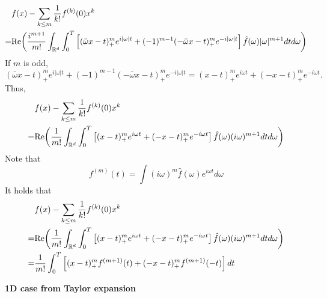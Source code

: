 \begin{equation}
\begin{split}
&f(x) - \sum_{k\le m}{1\over k!}f^{(k)}(0) x^k 
\\ 
=&{\rm Re} \bigg ({i^{m+1}\over m!}\int_{\mathbb{R}^d} \int_{0}^T\left[(\bar \omega  x - t)_+^me^{i|\omega|t}
+(-1)^{m-1}(-\bar \omega x - t)_+^me^{-i|\omega|t} \right]\hat{f}(\omega)|\omega|^{m+1}dt d\omega\bigg ) 
\end{split}
\end{equation}
If $m$ is odd,
$$
(\bar \omega  x - t)_+^me^{i|\omega|t}
+(-1)^{m-1}(-\bar \omega x - t)_+^me^{-i|\omega|t}
=
(x - t)_+^me^{i\omega t}
+(- x - t)_+^me^{-i\omega t}.
$$
Thus,
\begin{equation}
\begin{split}
&f(x) - \sum_{k\le m}{1\over k!}f^{(k)}(0) x^k 
\\ 
=&{\rm Re} \bigg ({1\over m!}\int_{\mathbb{R}^d} \int_{0}^T\left[(x - t)_+^me^{i \omega t}
+ (- x - t)_+^me^{-i \omega t} \right]\hat{f}(\omega) (i\omega)^{m+1}dt d\omega\bigg ) 
\end{split}
\end{equation}
Note that
\begin{equation}
f^{(m)}(t)=\int (i\omega)^m\hat{f}(\omega)e^{i\omega t}d\omega 
\end{equation} 
It holds that
\begin{equation}
\begin{split}
&f(x) - \sum_{k\le m}{1\over k!}f^{(k)}(0) x^k 
\\ 
=&{\rm Re} \bigg ({1\over m!}\int_{\mathbb{R}^d} \int_{0}^T\left[(x - t)_+^me^{i \omega t}
+ (- x - t)_+^me^{-i \omega t} \right]\hat{f}(\omega) (i\omega)^{m+1}dt d\omega\bigg ) 
\\
=& {1\over m!} \int_{0}^T\left[(x - t)_+^m f^{(m+1)}(t)
+ (- x - t)_+^mf^{(m+1)}(-t) \right] dt  
\end{split}
\end{equation} 

\noindent\textbf{1D case from Taylor expansion}

